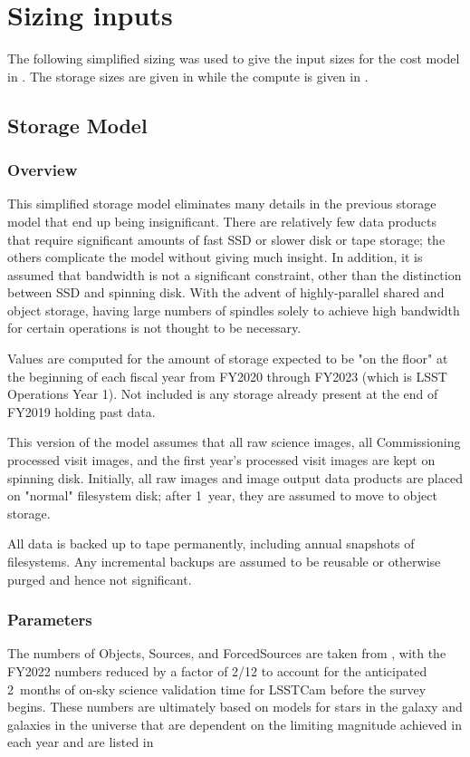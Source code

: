 \section{Sizing inputs}

The following simplified sizing was used to give the input sizes for the cost model in .
The storage sizes are given in  while the compute is given in .

\subsection{Storage Model}




\subsubsection{Overview}
This simplified storage model eliminates many details in the previous storage model  that end up being insignificant.
There are relatively few data products that require significant amounts of fast SSD or slower disk or tape storage; the others complicate the model without giving much insight.
In addition, it is assumed that bandwidth is not a significant constraint, other than the distinction between SSD and spinning disk.  With the advent of highly-parallel shared and object storage, having large numbers of spindles solely to achieve high bandwidth for certain operations is not thought to be necessary.

Values are computed for the amount of storage expected to be "on the floor" at the beginning of each fiscal year from FY2020 through FY2023 (which is LSST Operations Year 1).
Not included is any storage already present at the end of FY2019 holding past data.

This version of the model assumes that all raw science images, all Commissioning processed visit images, and the first year's processed visit images are kept on spinning disk.
Initially, all raw images and image output data products are placed on "normal" filesystem disk; after 1~year, they are assumed to move to object storage.

All data is backed up to tape permanently, including annual snapshots of filesystems.
Any incremental backups are assumed to be reusable or otherwise purged and hence not significant.

\subsubsection{Parameters}
The numbers of Objects, Sources, and ForcedSources are taken from , with the FY2022 numbers reduced by a factor of 2/12 to account for the anticipated 2~months of on-sky science validation time for LSSTCam before the survey begins.
These numbers are ultimately based on models for stars in the galaxy and galaxies in the universe that are dependent on the limiting magnitude achieved in each year and are listed in 

